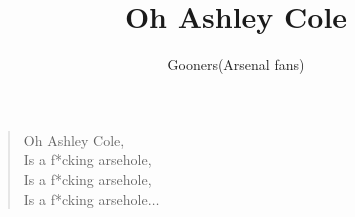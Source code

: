 \documentclass[a4paper,12pt]{article}
\title{Oh Ashley Cole}
\author{Gooners(Arsenal fans)}
\date{}
\begin{document}
	
	\maketitle
	
	\begin{verse}
		
		Oh Ashley Cole, \\
		Is a f*cking arsehole, \\
		Is a f*cking arsehole, \\
		Is a f*cking arsehole$\ldots$
		
	\end{verse}
	
\end{document}
